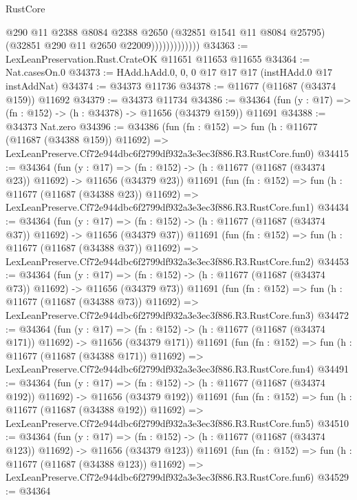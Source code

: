 \begin{lexlean}{RustCore}
\begin{coremodule}
                            @290
                            @11
                            @2388
                            @8084
                            @2388
                            @2650
                            (@32851 @1541 @11 @8084 @25795)
                            (@32851 @290 @11 @2650 @22009)))))))))))))
@34363 := LexLeanPreservation.Rust.CrateOK @11651 @11653 @11655
@34364 := Nat.casesOn.{0}
@34373 := HAdd.hAdd.{0, 0, 0} @17 @17 @17 (instHAdd.{0} @17 instAddNat)
@34374 := @34373 @11736
@34378 := @11677 (@11687 (@34374 @159)) @11692
@34379 := @34373 @11734
@34386 := @34364 (fun (y : @17) => (fn : @152) -> (h : @34378) -> @11656 (@34379 @159)) @11691
@34388 := @34373 Nat.zero
@34396 := @34386
    (fun (fn : @152) =>
    fun (h : @11677 (@11687 (@34388 @159)) @11692) =>
    LexLeanPreserve.Cf72e944dbc6f2799df932a3e3ec3f886.R3.RustCore.fun0)
@34415 := @34364
    (fun (y : @17) =>
    (fn : @152) -> (h : @11677 (@11687 (@34374 @23)) @11692) -> @11656 (@34379 @23))
    @11691
    (fun (fn : @152) =>
    fun (h : @11677 (@11687 (@34388 @23)) @11692) =>
    LexLeanPreserve.Cf72e944dbc6f2799df932a3e3ec3f886.R3.RustCore.fun1)
@34434 := @34364
    (fun (y : @17) =>
    (fn : @152) -> (h : @11677 (@11687 (@34374 @37)) @11692) -> @11656 (@34379 @37))
    @11691
    (fun (fn : @152) =>
    fun (h : @11677 (@11687 (@34388 @37)) @11692) =>
    LexLeanPreserve.Cf72e944dbc6f2799df932a3e3ec3f886.R3.RustCore.fun2)
@34453 := @34364
    (fun (y : @17) =>
    (fn : @152) -> (h : @11677 (@11687 (@34374 @73)) @11692) -> @11656 (@34379 @73))
    @11691
    (fun (fn : @152) =>
    fun (h : @11677 (@11687 (@34388 @73)) @11692) =>
    LexLeanPreserve.Cf72e944dbc6f2799df932a3e3ec3f886.R3.RustCore.fun3)
@34472 := @34364
    (fun (y : @17) =>
    (fn : @152) -> (h : @11677 (@11687 (@34374 @171)) @11692) -> @11656 (@34379 @171))
    @11691
    (fun (fn : @152) =>
    fun (h : @11677 (@11687 (@34388 @171)) @11692) =>
    LexLeanPreserve.Cf72e944dbc6f2799df932a3e3ec3f886.R3.RustCore.fun4)
@34491 := @34364
    (fun (y : @17) =>
    (fn : @152) -> (h : @11677 (@11687 (@34374 @192)) @11692) -> @11656 (@34379 @192))
    @11691
    (fun (fn : @152) =>
    fun (h : @11677 (@11687 (@34388 @192)) @11692) =>
    LexLeanPreserve.Cf72e944dbc6f2799df932a3e3ec3f886.R3.RustCore.fun5)
@34510 := @34364
    (fun (y : @17) =>
    (fn : @152) -> (h : @11677 (@11687 (@34374 @123)) @11692) -> @11656 (@34379 @123))
    @11691
    (fun (fn : @152) =>
    fun (h : @11677 (@11687 (@34388 @123)) @11692) =>
    LexLeanPreserve.Cf72e944dbc6f2799df932a3e3ec3f886.R3.RustCore.fun6)
@34529 := @34364

\end{coremodule}
\end{lexlean}
